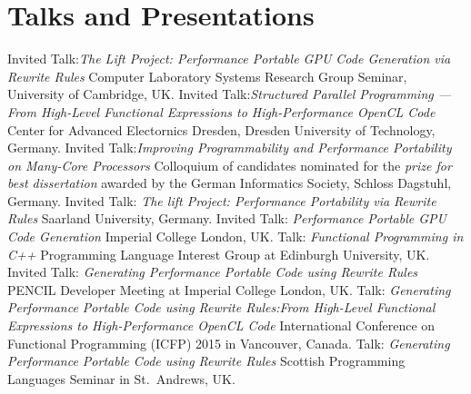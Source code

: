 \documentclass[11pt,a4paper]{moderncv}
\begin{document}
\section{Talks and Presentations}
         {Invited Talk:\newline \emph{The Lift Project: Performance Portable GPU Code Generation via Rewrite Rules}\newline
         Computer Laboratory Systems Research Group Seminar, University of Cambridge, UK.
         }
         {Invited Talk:\newline \emph{Structured Parallel Programming --- From High-Level Functional Expressions to High-Performance OpenCL Code}\newline
         Center for Advanced Electornics Dresden, Dresden University of Technology, Germany.
         }
         {Invited Talk:\newline \emph{Improving Programmability and Performance Portability on Many-Core Processors}\newline
         \small Colloquium of candidates nominated for the \emph{prize for best dissertation} awarded by the German Informatics Society, Schloss Dagstuhl, Germany.}
         {Invited Talk: \emph{The lift Project: Performance Portability via Rewrite Rules}\newline
          Saarland University, Germany.}
         {Invited Talk: \emph{Performance Portable GPU Code Generation}\newline
         \small Imperial College London, UK.}
         {Talk: \emph{Functional Programming in C++}\newline
         \small Programming Language Interest Group at Edinburgh University, UK.}
         {Invited Talk: \emph{Generating Performance Portable Code using Rewrite Rules}\newline
         \small PENCIL Developer Meeting at Imperial College London, UK.}
         {Talk: \emph{Generating Performance Portable Code using Rewrite Rules:\newline From High-Level Functional Expressions to High-Performance OpenCL Code}\newline
         \small International Conference on Functional Programming (ICFP) 2015 in Vancouver, Canada.}
         {Talk: \emph{Generating Performance Portable Code using Rewrite Rules}\newline
         \small Scottish Programming Languages Seminar in St.\ Andrews, UK.}
\end{document}
